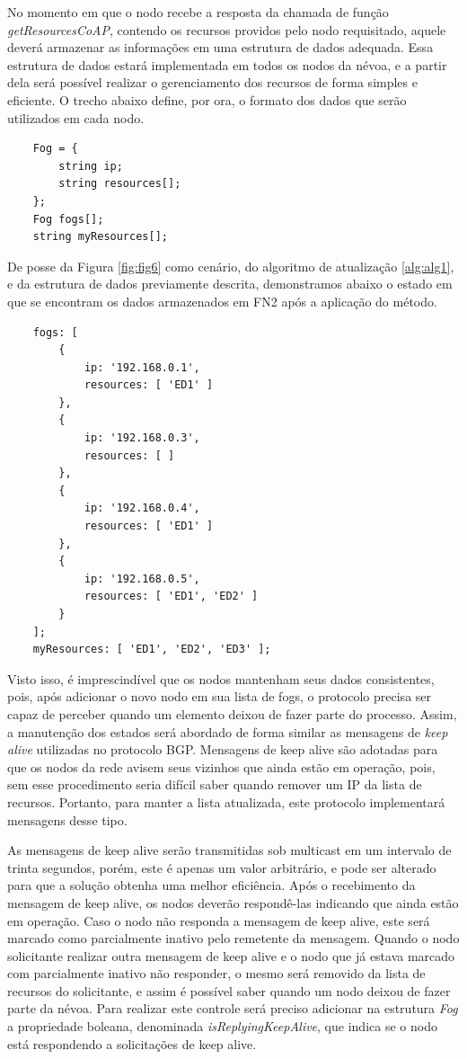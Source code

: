 No momento em que o nodo recebe a resposta da chamada de função \textit{getResourcesCoAP}, contendo os recursos providos pelo nodo requisitado, aquele deverá armazenar as informações em uma estrutura de dados adequada.
Essa estrutura de dados estará implementada em todos os nodos da névoa, e a partir dela será possível realizar o gerenciamento dos recursos de forma simples e eficiente.
O trecho abaixo define, por ora, o formato dos dados que serão utilizados em cada nodo.


\begin{verbatim}
    Fog = {
        string ip;
        string resources[];    
    };
    Fog fogs[];
    string myResources[];
\end{verbatim}

De posse da Figura \ref{fig:fig6} como cenário, do algoritmo de atualização \ref{alg:alg1}, e da estrutura de dados previamente descrita,
demonstramos abaixo o estado em que se encontram os dados armazenados em FN2 após a aplicação do método.

\begin{verbatim}
    fogs: [
        {
            ip: '192.168.0.1',
            resources: [ 'ED1' ]
        },
        {
            ip: '192.168.0.3',
            resources: [ ]
        },
        {
            ip: '192.168.0.4',
            resources: [ 'ED1' ]
        },
        {
            ip: '192.168.0.5',
            resources: [ 'ED1', 'ED2' ]
        }
    ];
    myResources: [ 'ED1', 'ED2', 'ED3' ];
\end{verbatim}

Visto isso, é imprescindível que os nodos mantenham seus dados consistentes, pois, após adicionar o novo nodo em sua lista de fogs, o protocolo precisa ser capaz de perceber quando um elemento
deixou de fazer parte do processo. Assim, a manutenção dos estados será abordado de forma similar as mensagens de \textit{keep alive} utilizadas no protocolo BGP\cite{Rekhter:1995}.
Mensagens de keep alive são adotadas para que os nodos da rede avisem seus vizinhos que ainda estão em operação, pois, sem esse procedimento seria difícil
saber quando remover um IP da lista de recursos. Portanto, para manter a lista atualizada, este protocolo implementará mensagens desse tipo.

As mensagens de keep alive serão transmitidas sob multicast em um intervalo de trinta segundos, porém, este é apenas um valor arbitrário, e pode ser alterado
para que a solução obtenha uma melhor eficiência.
Após o recebimento da mensagem de keep alive, os nodos deverão respondê-las indicando que ainda estão em operação.
Caso o nodo não responda a mensagem de keep alive, este será marcado como parcialmente inativo pelo remetente da mensagem.
Quando o nodo solicitante realizar outra mensagem de keep alive e o nodo que já estava marcado com parcialmente inativo não responder, o mesmo será removido da lista de recursos do
solicitante, e assim é possível saber quando um nodo deixou de fazer parte da névoa.
Para realizar este controle será preciso adicionar na estrutura \textit{Fog} a propriedade boleana, denominada \textit{isReplyingKeepAlive}, que indica se o nodo está respondendo a solicitações de keep alive.

